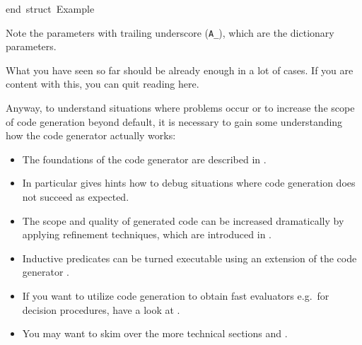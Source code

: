 \begin{isabellebody}
\begin{isamarkuptext}
\isanewline
end{}\ {}{}struct\ Example{}{}\isanewline%
\end{isamarkuptext}%
\isamarkuptrue%
%
\endisatagquotetypewriter
{\isafoldquotetypewriter}%
%
\isadelimquotetypewriter
%
\endisadelimquotetypewriter
%
\begin{isamarkuptext}%
\noindent Note the parameters with trailing underscore (\verb|A_|), which are the dictionary parameters.%
\end{isamarkuptext}%
\isamarkuptrue%
%
\isamarkuptrue%
%
\begin{isamarkuptext}%
What you have seen so far should be already enough in a lot of
  cases.  If you are content with this, you can quit reading here.

  Anyway, to understand situations where problems occur or to increase
  the scope of code generation beyond default, it is necessary to gain
  some understanding how the code generator actually works:

  \begin{itemize}

    \item The foundations of the code generator are described in
      .

    \item In particular  gives hints how to
      debug situations where code generation does not succeed as
      expected.

    \item The scope and quality of generated code can be increased
      dramatically by applying refinement techniques, which are
      introduced in .

    \item Inductive predicates can be turned executable using an
      extension of the code generator .

    \item If you want to utilize code generation to obtain fast
      evaluators e.g.~for decision procedures, have a look at
      .

    \item You may want to skim over the more technical sections
       and .


\end{itemize}
\end{isamarkuptext}
\end{isabellebody}
